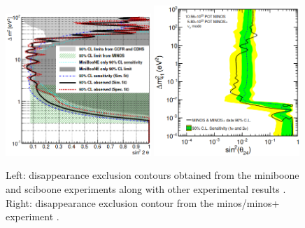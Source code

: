 \begin{figure}[h!]
    \centering
    \includegraphics[width = 0.49\textwidth, height = 0.49\textwidth]{figures-chap6/external_limits/numu_disapp_MiniBooNE_SciBooNE.png}
    \includegraphics[width = 0.49\textwidth, height = 0.49\textwidth]{figures-chap6/external_limits/numu_disapp_Minos.png}
    \caption[\nue disappearance limits from the \gls{miniboone}/\gls{sciboone} and \gls{minos}/\gls{minos}+ experiments.]{Left: \numu disappearance exclusion contours obtained from the \gls{miniboone} and \gls{sciboone} experiments along with other experimental results \cite{MiniBooNE/SciBooNE_numu_disapp_contour}. Right: \numu disappearance exclusion contour from the \gls{minos}/\gls{minos}+ experiment \cite{MINOS_numu_disapp_contour}.}
    \label{fig:miniboone_sciboone_minos}
\end{figure}

